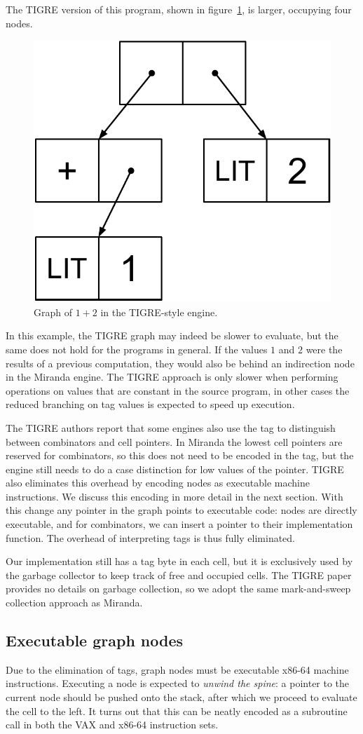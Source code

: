 \documentclass[conference]{IEEEtran}
\begin{document}
The TIGRE version of this program, shown in figure~\ref{fig:1_plus_2_tigre}, is larger, occupying four nodes.

\begin{figure}
    \includegraphics[width=.46\columnwidth]{1_plus_2_tigre}
    \centering
    \caption{
        Graph of $1 + 2$ in the TIGRE-style engine.
    }
    \label{fig:1_plus_2_tigre}
\end{figure}

In this example, the TIGRE graph may indeed be slower to evaluate, but the same does not hold for the programs in general.
If the values $1$ and $2$ were the results of a previous computation, they would also be behind an indirection node in the Miranda engine.
The TIGRE approach is only slower when performing operations on values that are constant in the source program, in other cases the reduced branching on tag values is expected to speed up execution.

The TIGRE authors report that some engines also use the tag to distinguish between combinators and cell pointers.
In Miranda the lowest cell pointers are reserved for combinators, so this does not need to be encoded in the tag, but the engine still needs to do a case distinction for low values of the pointer.
TIGRE also eliminates this overhead by encoding nodes as executable machine instructions.
We discuss this encoding in more detail in the next section.
With this change any pointer in the graph points to executable code: nodes are directly executable, and for combinators, we can insert a pointer to their implementation function.
The overhead of interpreting tags is thus fully eliminated.

Our implementation still has a tag byte in each cell, but it is exclusively used by the garbage collector to keep track of free and occupied cells.
The TIGRE paper provides no details on garbage collection, so we adopt the same mark-and-sweep collection approach as Miranda.

\subsection{Executable graph nodes}
Due to the elimination of tags, graph nodes must be executable x86-64 machine instructions.
Executing a node is expected to \emph{unwind the spine}: a pointer to the current node should be pushed onto the stack, after which we proceed to evaluate the cell to the left.
It turns out that this can be neatly encoded as a subroutine call in both the VAX and x86-64 instruction sets.
\end{document}
